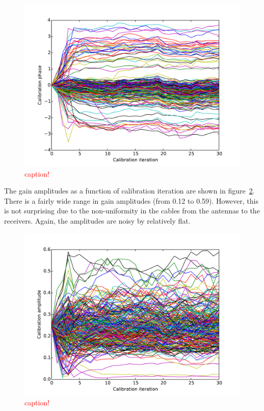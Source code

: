 \documentclass[a4paper,fleqn,usenatbib]{../mnras}
\begin{document}
\begin{figure}
\begin{center}
\includegraphics[width=\columnwidth]{figures/cal_paper_data_phases.pdf}
\caption{\textcolor{red}{caption!}}
\label{fig:data_phase}
\end{center}
\end{figure}

The gain amplitudes as a function of calibration iteration are shown in figure~\ref{fig:data_amp}. There is a fairly wide range in gain amplitudes (from 0.12 to 0.59). However, this is not surprising due to the non-uniformity in the cables from the antennas to the receivers. Again, the amplitudes are noisy by relatively flat.

\begin{figure}
\begin{center}
\includegraphics[width=\columnwidth]{figures/cal_paper_data_amps.pdf}
\caption{\textcolor{red}{caption!}}
\label{fig:data_amp}
\end{center}
\end{figure}
\end{document}

